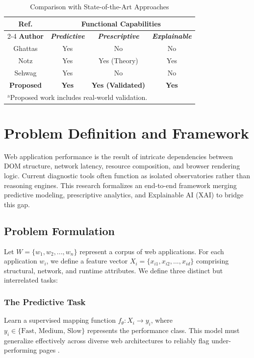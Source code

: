 \documentclass[conference]{IEEEtran}
\begin{document}
\begin{table}[htbp]
\caption{Comparison with State-of-the-Art Approaches}
\begin{center}
\begin{tabular}{|c|c|c|c|}
\hline
\textbf{Ref.}&\multicolumn{3}{|c|}{\textbf{Functional Capabilities}} \\
\cline{2-4} 
\textbf{Author} & \textbf{\textit{Predictive}}& \textbf{\textit{Prescriptive}}& \textbf{\textit{Explainable}} \\
\hline
Ghattas \cite{ghattas2025}& Yes & No & No \\
\hline
Notz \cite{notz2024}& Yes & Yes (Theory) & Yes \\
\hline
Sehwag \cite{sehwag2024}& Yes & No & No \\
\hline
\textbf{Proposed}& \textbf{Yes} & \textbf{Yes (Validated)} & \textbf{Yes} \\
\hline
\multicolumn{4}{l}{$^{\mathrm{a}}$Proposed work includes real-world validation.}
\end{tabular}
\label{tab1}
\end{center}
\end{table}

\section{Problem Definition and Framework}

Web application performance is the result of intricate dependencies between DOM structure, network latency, resource composition, and browser rendering logic. Current diagnostic tools often function as isolated observatories rather than reasoning engines. This research formalizes an end-to-end framework merging predictive modeling, prescriptive analytics, and Explainable AI (XAI) to bridge this gap.

\subsection{Problem Formulation}
Let $W=\{w_{1},w_{2},...,w_{n}\}$ represent a corpus of web applications. For each application $w_{i}$, we define a feature vector $X_{i}=\{x_{i1},x_{i2},...,x_{id}\}$ comprising structural, network, and runtime attributes. We define three distinct but interrelated tasks:

\subsubsection{The Predictive Task}
Learn a supervised mapping function $f_{\theta}:X_{i}\rightarrow y_{i}$, where $y_{i}\in \{\text{Fast, Medium, Slow}\}$ represents the performance class. This model must generalize effectively across diverse web architectures to reliably flag under-performing pages \cite{ghattas2025}.
\end{document}
